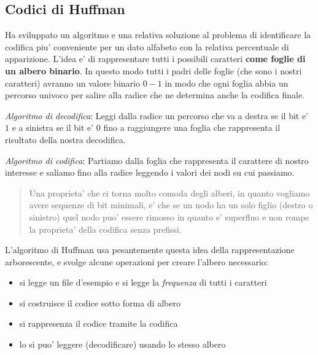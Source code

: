 \documentclass{article}
\begin{document}
\subsection{Codici di Huffman}

Ha sviluppato un algoritmo e una relativa soluzione al problema di identificare
la codifica piu' conveniente per un dato alfabeto con la relativa percentuale di
apparizione. L'idea e' di rappresentare tutti i possibili caratteri \textbf{come
foglie di un albero binario}. In questo modo tutti i padri delle foglie (che sono
i nostri caratteri) avranno un valore binario $0-1$ in modo che ogni foglia abbia
un percorso univoco per salire alla radice che ne determina anche la codifica finale.

\emph{Algoritmo di decodifica}: Leggi dalla radice un percorso che va a destra se il
bit e' $1$ e a sinistra se il bit e' $0$ fino a raggiungere una foglia che rappresenta
il risultato della nostra decodifica.

\emph{Algoritmo di codifica}: Partiamo dalla foglia che rappresenta il carattere
di nostro interesse e saliamo fino alla radice leggendo i valori dei nodi su cui passiamo.

\begin{quote}
  Una proprieta' che ci torna molto comoda degli alberi, in quanto vogliamo avere
  sequenze di bit minimali, e' che se un nodo ha un solo figlio (destro o sinistro)
  quel nodo puo' essere rimosso in quanto e' superfluo e non rompe la proprieta'
  della codifica senza prefissi.
\end{quote}

L'algoritmo di Huffman usa pesantemente questa idea della rappresentazione arborescente,
e svolge alcune operazioni per creare l'albero necessario:

\begin{itemize}
  \item si legge un file d'esempio e si legge la \emph{frequenza} di tutti i caratteri
  \item si costruisce il codice sotto forma di albero
  \item si rappresenza il codice tramite la codifica
  \item lo si puo' leggere (decodificare) usando lo stesso albero
\end{itemize}
\end{document}
